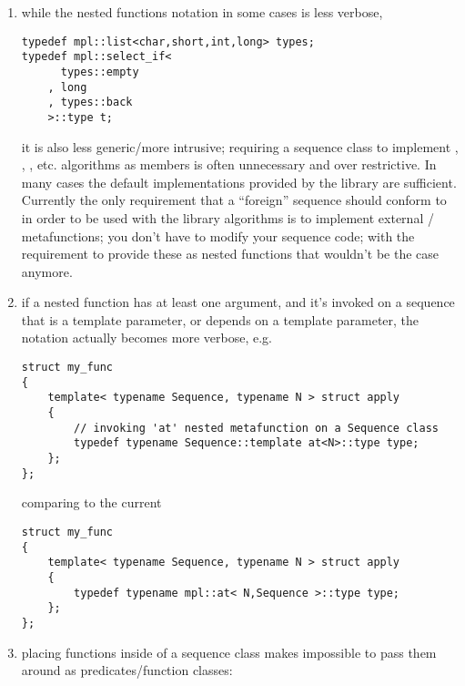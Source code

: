 \documentclass{kapproc}
\newcommand{\mfns}{meta\-func\-tions}
\begin{document}
\begin{enumerate}
 \item while the nested functions notation in some cases is 
 less verbose, 

{\small
\begin{codesamp}\begin{verbatim}
typedef mpl::list<char,short,int,long> types;
typedef mpl::select_if<
      types::empty
    , long
    , types::back
    >::type t;
\end{verbatim}
\end{codesamp}
}

it is also less generic/more intrusive; requiring a sequence 
class to implement , , , etc. 
algorithms as members is often unnecessary and over restrictive. 
In many cases the default implementations provided by the library 
are sufficient.
Currently the only requirement that a ``foreign'' sequence should 
conform to in order to be used with the library algorithms is to 
implement external / \mfns; you 
don't have to modify your sequence code; with the requirement to 
provide these as nested functions that wouldn't be the case anymore. 

\item if a nested function has at least one argument, and it's 
invoked on a sequence that is a template parameter, or depends 
on a template parameter, the notation actually becomes more 
verbose, e.g. 

{\small
\begin{codesamp}\begin{verbatim}
struct my_func
{
    template< typename Sequence, typename N > struct apply
    {
        // invoking 'at' nested metafunction on a Sequence class
        typedef typename Sequence::template at<N>::type type;
    };
};
\end{verbatim}
\end{codesamp}
}

comparing to the current 

{\small
\begin{codesamp}\begin{verbatim}
struct my_func
{
    template< typename Sequence, typename N > struct apply
    {
        typedef typename mpl::at< N,Sequence >::type type;
    };
};
\end{verbatim}
\end{codesamp}
}

\item placing functions inside of a sequence class makes 
impossible to pass them around as predicates/function classes: 


\end{enumerate}
\end{document}
